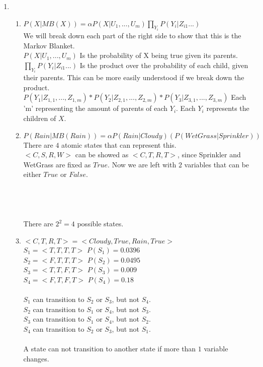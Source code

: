 \documentclass[12pt,a4paper]{report}
\begin{document}
\begin{enumerate}
\begin{enumerate}
\end{enumerate}

\pagebreak
\item
\begin{enumerate}
	\item
	$P(X|MB(X)) = \alpha P(X|U_1, ... , U_m)\prod_{Y_{i}}P(Y_i|Z_{i1}...)$\\
	We will break down each part of the right side to show that this is the Markov Blanket.\\
	$P(X|U_1, ... , U_m)$ Is the probability of X being true given its parents.\\
	$\prod_{Y_{i}}P(Y_i|Z_{i1}...)$ Is the product over the probability of each child, given their parents. This can be more easily understood if we break down the product.\\
	$P(Y_1|Z_{1,1}, ... , Z_{1,m})*P(Y_2|Z_{2,1}, ... ,Z_{2,m})*P(Y_3|Z_{3,1}, ... , Z_{3,m})$ Each 'm' representing the amount of parents of each $Y_i$. Each $Y_i$ represents the children of $X$.\\
	
	\item
	$P(Rain|MB(Rain)) = \alpha P(Rain|Cloudy)(P(WetGrass|Sprinkler))$\\
	There are $4$ atomic states that can represent this.\\
	$<C,S,R,W>$ can be showed as $<C,T,R,T>$, since Sprinkler and WetGrass are fixed as $True$. Now we are left with $2$ variables that can be either $True$ or $False$.\\
	\\
	\\
	\\
	\\
	There are $2^2 = 4$ possible states.\\
	
	\item
	$<C,T,R,T> = <Cloudy, True, Rain, True>$\\ 
	$S_1 = <T,T,T,T>$ $P(S_1) = 0.0396$\\
	$S_2 = <F,T,T,T>$ $P(S_2) = 0.0495$\\
	$S_3 = <T,T,F,T>$ $P(S_3) = 0.009$\\
	$S_4 = <F,T,F,T>$ $P(S_4) = 0.18$\\
	\\$S_1$ can transition to $S_2$ or $S_3$, but not $S_4$.\\
	$S_2$ can transition to $S_1$ or $S_4$, but not $S_3$.\\
	$S_3$ can transition to $S_1$ or $S_4$, but not $S_2$.\\
	$S_4$ can transition to $S_2$ or $S_3$, but not $S_1$.\\
	\\A state can not transition to another state if more than $1$ variable changes.\\
	

\end{enumerate}
\end{enumerate}
\end{document}
